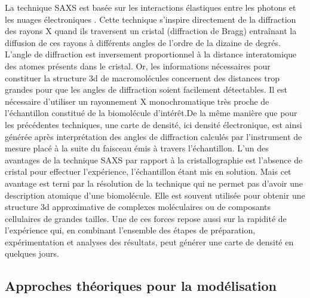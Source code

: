 La technique SAXS est basée sur les interactions élastiques entre les photons et les nuages électroniques \cite{guimer1955small}. Cette technique s'inspire directement de la diffraction des rayons X quand ils traversent un cristal (diffraction de Bragg) entraînant la diffusion de ces rayons à différents angles de l'ordre de la dizaine de degrés. L'angle de diffraction est inversement proportionnel à la distance interatomique des atomes présents dans le cristal. Or, les informations nécessaires pour constituer la structure 3d de macromolécules concernent des distances trop grandes pour que les angles de diffraction soient facilement détectables. Il est nécessaire d'utiliser un rayonnement X monochromatique très proche de l'échantillon constitué de la biomolécule d'intérêt.De la même manière que pour les précédentes techniques, une carte de densité, ici densité électronique, est ainsi générée après interprétation des angles de diffraction calculés par l'instrument de mesure placé à la suite du faisceau émis à travers l'échantillon.
L'un des avantages de la technique SAXS par rapport à la cristallographie est l'absence de cristal pour effectuer l'expérience, l'échantillon étant mis en solution. Mais cet avantage est terni par la résolution de la technique qui ne permet pas d'avoir une description atomique d'une biomolécule. Elle est souvent utilisée pour obtenir une structure 3d approximative de complexes moléculaires ou de composants cellulaires de grandes tailles. Une de ces forces repose aussi sur la rapidité de l'expérience qui, en combinant l'ensemble des étapes de préparation, expérimentation et analyses des résultats, peut générer une carte de densité en quelques jours.



\subsection{Approches théoriques pour la modélisation}

